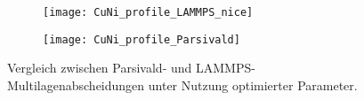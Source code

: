 \begin{figure}
  \captionsetup[subfigure]{singlelinecheck=false}
  \def\subfigwidth{7cm}
  \begin{subfigure}[t]{\subfigwidth}
    \texttt{[image: CuNi\_profile\_LAMMPS\_nice]}
  \end{subfigure}
  \hfill
  \begin{subfigure}[t]{\subfigwidth}
    \texttt{[image: CuNi\_profile\_Parsivald]}
  \end{subfigure}
  \caption[Vergleich zwischen Parsivald- und LAMMPS-Multilagenabscheidungen]{
    Vergleich zwischen Parsivald- und LAMMPS-Multilagenabscheidungen unter Nutzung optimierter Parameter.
  }
  \label{fig:multilayerresults}
\end{figure}
